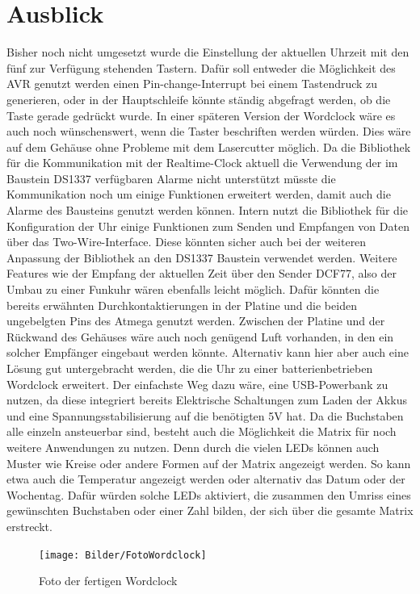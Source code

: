 \documentclass[12pt,journal,compsoc]{IEEEtran}
\begin{document}
\section{Ausblick}
Bisher noch nicht umgesetzt wurde die Einstellung der aktuellen Uhrzeit mit den fünf zur Verfügung stehenden Tastern. Dafür soll entweder die Möglichkeit des AVR genutzt werden einen Pin-change-Interrupt  bei einem Tastendruck zu generieren, oder in der Hauptschleife könnte ständig abgefragt werden, ob die Taste gerade gedrückt wurde. In einer späteren Version der Wordclock wäre es auch noch wünschenswert, wenn die Taster  beschriften werden würden. Dies wäre auf dem Gehäuse ohne Probleme mit dem Lasercutter möglich.
Da die Bibliothek für die Kommunikation mit der Realtime-Clock aktuell die Verwendung der im Baustein DS1337 verfügbaren Alarme nicht unterstützt müsste die Kommunikation noch um einige Funktionen erweitert werden, damit auch die Alarme des Bausteins genutzt werden können. Intern nutzt die Bibliothek für die Konfiguration der Uhr einige Funktionen zum Senden und Empfangen von Daten über das Two-Wire-Interface. Diese könnten sicher auch bei der weiteren Anpassung der Bibliothek an den DS1337 Baustein verwendet werden.
Weitere Features wie der Empfang der aktuellen Zeit über den Sender DCF77, also der Umbau zu einer Funkuhr wären ebenfalls leicht möglich. Dafür könnten die bereits erwähnten Durchkontaktierungen in der Platine und die beiden ungebelgten Pins des Atmega genutzt werden. Zwischen der Platine und der Rückwand des Gehäuses wäre auch noch genügend Luft vorhanden, in den ein solcher Empfänger eingebaut werden könnte. Alternativ kann hier aber auch eine Lösung gut untergebracht werden, die die Uhr zu einer batterienbetrieben Wordclock erweitert. Der einfachste Weg dazu wäre, eine USB-Powerbank zu nutzen, da diese integriert bereits Elektrische Schaltungen zum Laden der Akkus und eine Spannungsstabilisierung auf die benötigten 5V hat.
Da die Buchstaben alle einzeln ansteuerbar sind, besteht auch die Möglichkeit die Matrix für noch weitere Anwendungen zu nutzen. Denn durch die vielen LEDs können auch Muster wie Kreise oder andere Formen auf der Matrix angezeigt werden. So kann etwa auch die Temperatur angezeigt werden oder alternativ das Datum oder der Wochentag. Dafür würden solche LEDs aktiviert, die zusammen den Umriss eines gewünschten Buchstaben oder einer Zahl bilden, der sich über die gesamte Matrix erstreckt.
\begin{figure}
	\centering
	\texttt{[image: Bilder/FotoWordclock]}
	\caption{Foto der fertigen Wordclock} 
	\label{fig:Foto}
\end{figure}

\nocite{*}
%
%





\end{document}
